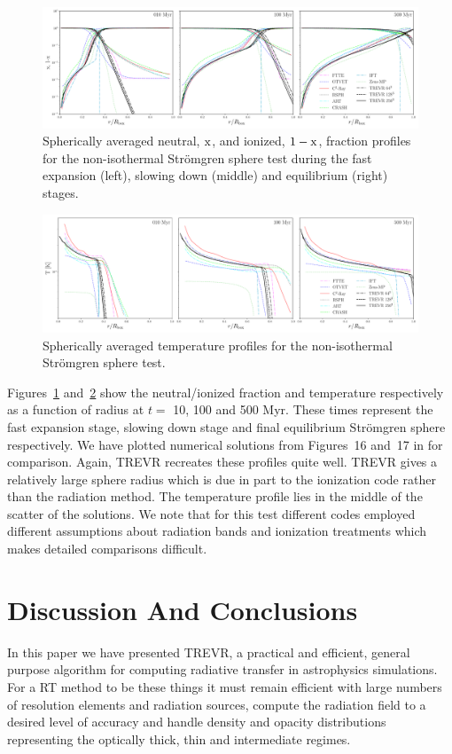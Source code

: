 \documentclass[fleq,usenatbib]{mnras}
\newcommand{\acro}{TREVR}
\newcommand{\strom}{Str\"omgren}
\begin{document}
{\begin{figure}
\includegraphics[width=0.95\linewidth]{Figures/strom_fraction.pdf}
\caption{Spherically averaged neutral, $\rm x$, and ionized, $\rm 1-x$, 
fraction profiles for the non-isothermal \strom{} sphere test during the fast 
expansion (left), slowing down (middle) and equilibrium (right) stages.}
\label{fig:stromtherm}
\end{figure}
\begin{figure}
\includegraphics[width=0.95\linewidth]{Figures/strom_temp.pdf}
\caption{Spherically averaged temperature profiles for the non-isothermal 
\strom{} sphere test.}
\label{fig:stromtemp}
\end{figure}
Figures~\ref{fig:stromtherm} and~\ref{fig:stromtemp} show the neutral/ionized 
fraction and temperature respectively as a function of radius at $t=$ 10, 100
and 500 Myr. These times represent the fast expansion stage, slowing down 
stage and final equilibrium \strom{} sphere respectively. We have plotted 
numerical solutions from Figures~16 and~17 in \cite{ilievEt06} for comparison. 
Again, \acro{} recreates these profiles quite well.
\acro{} gives a relatively large sphere radius which is 
due in part to the ionization code rather than the radiation method.  
The temperature profile lies in the middle of the scatter of the 
\cite{ilievEt06} solutions.  We note that for this test different codes employed
different assumptions about radiation bands and ionization treatments which
makes detailed comparisons difficult.

\section{Discussion And Conclusions}\label{sec:disc}
In this paper we have presented \acro{}, a practical and efficient, general 
purpose algorithm for computing radiative transfer in astrophysics 
simulations. For a RT method to be these things it must remain efficient with 
large numbers of resolution elements and radiation sources, compute the 
radiation field to a desired level of accuracy and handle density and opacity 
distributions representing the optically thick, thin and intermediate regimes.

}
\end{document}
